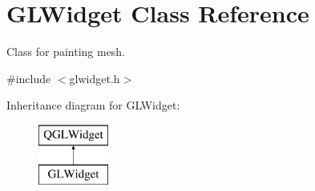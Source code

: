 \hypertarget{class_g_l_widget}{\section{G\+L\+Widget Class Reference}
\label{class_g_l_widget}
}


Class for painting mesh.  




{\ttfamily \#include $<$glwidget.\+h$>$}

Inheritance diagram for G\+L\+Widget\+:\begin{figure}[H]
\begin{center}
\leavevmode
\includegraphics[height=2.000000cm]{class_g_l_widget}
\end{center}
\end{figure}
